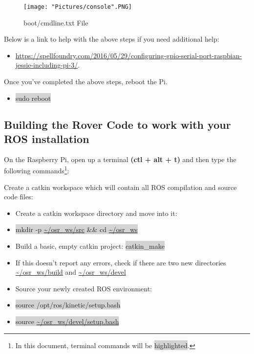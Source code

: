 \documentclass{article}
\begin{document}
\begin{figure}[H]
 	\centering
	\texttt{[image: "Pictures/console".PNG]}
 	\caption{boot/cmdline.txt File}
	\label{console}
\end{figure}

\noindent Below is a link to help with the above steps if you need additional help:
\begin{itemize}
	\item \href{https://spellfoundry.com/2016/05/29/configuring-gpio-serial-port-raspbian-jessie-including-pi-3/}{https://spellfoundry.com/2016/05/29/configuring-gpio-serial-port-raspbian-jessie-including-pi-3/}.
\end{itemize}
\noindent Once you've completed the above steps, reboot the Pi.
\begin{itemize}
	\item[] \colorbox{lightgray}{sudo reboot}
\end{itemize}

\subsection{Building the Rover Code to work with your ROS installation}
On the Raspberry Pi, open up a terminal \textbf{(ctl + alt + t)} and then type the following commands\footnote{In this document, terminal commands will be \colorbox{lightgray}{highlighted}.}:

Create a catkin workspace which will contain all ROS compilation and source code files:

\begin{itemize}
	\item[] Create a catkin workspace directory and move into it:
    \item[] \colorbox{lightgray}{mkdir -p \url{~/osr_ws/src} \&\& cd \url{~/osr\_ws}}
	\item[] Build a basic, empty catkin project: \colorbox{lightgray}{catkin\_make}
	\item[] If this doesn't report any errors, check if there are two new directories \url{~/osr_ws/build} and  \url{~/osr_ws/devel}
\end{itemize}

\begin{itemize}
	\item[] Source your newly created ROS environment:
	\item[] \colorbox{lightgray}{source /opt/ros/kinetic/setup.bash}
	\item[] \colorbox{lightgray}{source \url{~/osr\_ws/devel/setup.bash}}
\end{itemize}
\end{document}

